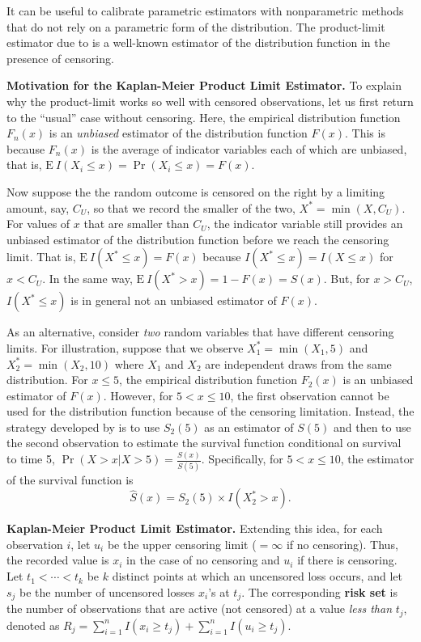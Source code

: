 \documentclass[]{book}
\theoremstyle{definition}
\theoremstyle{definition}
\theoremstyle{definition}
\theoremstyle{remark}
\begin{document}
It can be useful to calibrate parametric estimators with nonparametric
methods that do not rely on a parametric form of the distribution. The
product-limit estimator due to \citep{kaplan1958} is a well-known
estimator of the distribution function in the presence of censoring.

\textbf{Motivation for the Kaplan-Meier Product Limit Estimator.} To
explain why the product-limit works so well with censored observations,
let us first return to the ``usual'' case without censoring. Here, the
empirical distribution function \(F_n(x)\) is an \emph{unbiased}
estimator of the distribution function \(F(x)\). This is because
\(F_n(x)\) is the average of indicator variables each of which are
unbiased, that is, \(\mathrm{E~} I(X_i \le x) = \Pr(X_i \le x) = F(x)\).

Now suppose the the random outcome is censored on the right by a
limiting amount, say, \(C_U\), so that we record the smaller of the two,
\(X^* = \min(X, C_U)\). For values of \(x\) that are smaller than
\(C_U\), the indicator variable still provides an unbiased estimator of
the distribution function before we reach the censoring limit. That is,
\(\mathrm{E~} I(X^* \le x) = F(x)\) because
\(I(X^* \le x) = I(X \le x)\) for \(x < C_U\). In the same way,
\(\mathrm{E~} I(X^* > x) = 1 -F(x) = S(x)\). But, for \(x>C_U\),
\(I(X^* \le x)\) is in general not an unbiased estimator of \(F(x)\).

As an alternative, consider \emph{two} random variables that have
different censoring limits. For illustration, suppose that we observe
\(X_1^* = \min(X_1, 5)\) and \(X_2^* = \min(X_2, 10)\) where \(X_1\) and
\(X_2\) are independent draws from the same distribution. For
\(x \le 5\), the empirical distribution function \(F_2(x)\) is an
unbiased estimator of \(F(x)\). However, for \(5 < x \le 10\), the first
observation cannot be used for the distribution function because of the
censoring limitation. Instead, the strategy developed by
\citep{kaplan1958} is to use \(S_2(5)\) as an estimator of \(S(5)\) and
then to use the second observation to estimate the survival function
conditional on survival to time 5,
\(\Pr(X > x | X >5) = \frac{S(x)}{S(5)}\). Specifically, for
\(5 < x \le 10\), the estimator of the survival function is \[
\hat{S}(x) = S_2(5) \times I(X_2^* > x ) .
\]

\textbf{Kaplan-Meier Product Limit Estimator.} Extending this idea, for
each observation \(i\), let \(u_i\) be the upper censoring limit
(\(=\infty\) if no censoring). Thus, the recorded value is \(x_i\) in
the case of no censoring and \(u_i\) if there is censoring. Let
\(t_{1} <\cdots< t_{k}\) be \(k\) distinct points at which an uncensored
loss occurs, and let \(s_j\) be the number of uncensored losses
\(x_i\)'s at \(t_{j}\). The corresponding \textbf{risk set} is the
number of observations that are active (not censored) at a value
\emph{less than} \(t_{j}\), denoted as
\(R_j = \sum_{i=1}^n I(x_i \geq t_{j}) + \sum_{i=1}^n I(u_i \geq t_{j})\).
\end{document}
